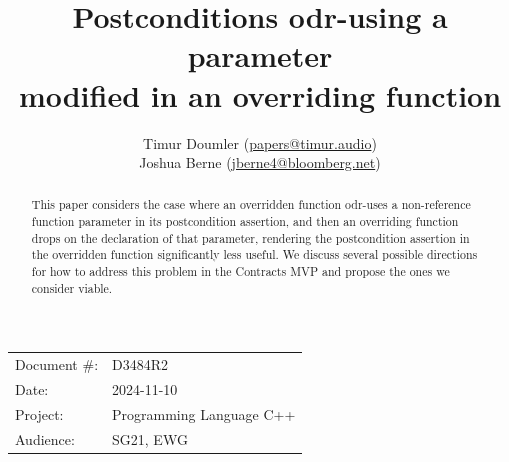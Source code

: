 

 \usepackage[bottom]{footmisc} 

 \usepackage{longtable}


\usepackage{tikz,lipsum,lmodern}
\usepackage[most]{tcolorbox}



\usepackage{titlesec}
\usepackage{tocloft}


\newcommand{\changelocaltocdepth}[1]{%
  \addtocontents{toc}{\protect\setcounter{tocdepth}{#1}}%
  \setcounter{tocdepth}{#1}%
}

\setcounter{tocdepth}{3}



\title{Postconditions odr-using a parameter \\ modified in an overriding function}
\author{
Timur Doumler \small(\href{mailto:papers@timur.audio}{papers@timur.audio}) \\
Joshua Berne \small(\href{mailto:jberne4@bloomberg.net}{jberne4@bloomberg.net}) \\
}
\date{}
\maketitle

\begin{tabular}{ll}
Document \#: & D3484R2 \\
Date: &2024-11-10 \\
Project: & Programming Language C++ \\
Audience: & SG21, EWG
\end{tabular}

\begin{abstract}
This paper considers the case where an overridden function odr-uses a non-reference function parameter in its postcondition assertion, and then an overriding function drops  on the declaration of that parameter, rendering the postcondition assertion in the overridden function significantly less useful. We discuss several possible directions for how to address this problem in the Contracts MVP \cite{P2900R10} and propose the ones we consider viable.
\end{abstract}

